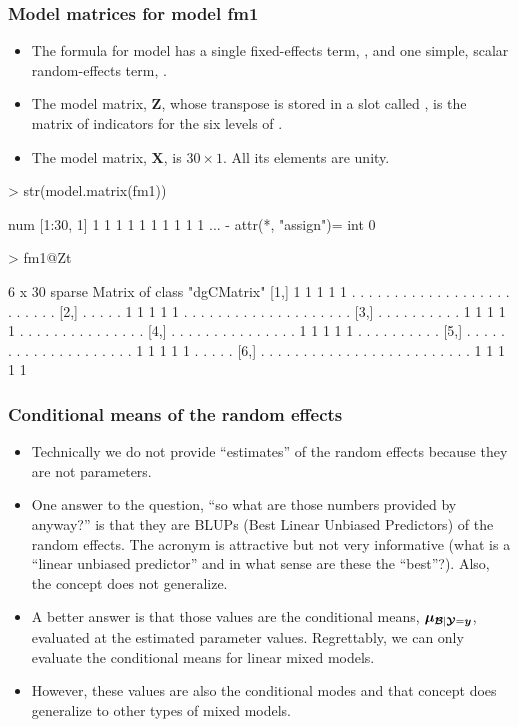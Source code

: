 \begin{frame}[fragile]
  \frametitle{Model matrices for model fm1}
  \begin{itemize}
  \item The formula for model  has a single fixed-effects
    term, , and one simple, scalar random-effects term,
    .
  \item The model matrix, $\bm Z$, whose transpose is stored in a slot
    called , is the matrix of indicators for the six levels
    of .
  \item The model matrix, $\bm X$, is $30\times 1$. All its elements
    are unity.
  \end{itemize}
\begin{Schunk}
\begin{Sinput}
> str(model.matrix(fm1))
\end{Sinput}
\begin{Soutput}
 num [1:30, 1] 1 1 1 1 1 1 1 1 1 1 ...
 - attr(*, "assign")= int 0
\end{Soutput}
\begin{Sinput}
> fm1@Zt
\end{Sinput}
\begin{Soutput}
6 x 30 sparse Matrix of class "dgCMatrix"
[1,] 1 1 1 1 1 . . . . . . . . . . . . . . . . . . . . . . . . .
[2,] . . . . . 1 1 1 1 1 . . . . . . . . . . . . . . . . . . . .
[3,] . . . . . . . . . . 1 1 1 1 1 . . . . . . . . . . . . . . .
[4,] . . . . . . . . . . . . . . . 1 1 1 1 1 . . . . . . . . . .
[5,] . . . . . . . . . . . . . . . . . . . . 1 1 1 1 1 . . . . .
[6,] . . . . . . . . . . . . . . . . . . . . . . . . . 1 1 1 1 1
\end{Soutput}
\end{Schunk}
\end{frame}

\begin{frame}
  \frametitle{Conditional means of the random effects}
  \begin{itemize}
  \item Technically we do not provide ``estimates'' of the random
    effects because they are not parameters.  
  \item One answer to the question, ``so what are those numbers
    provided by  anyway?'' is that they are BLUPs (Best
    Linear Unbiased Predictors) of the random effects.  The acronym is
    attractive but not very informative (what is a ``linear unbiased
    predictor'' and in what sense are these the ``best''?).  Also, the
    concept does not generalize.
  \item A better answer is that those values are the conditional
    means, $\bm\mu_{\bm{\mathcal{B}}|\bm{\mathcal{Y}} =\bm y}$, evaluated at the estimated
    parameter values.  Regrettably, we can only evaluate the
    conditional means for linear mixed models.
  \item However, these values are also the conditional modes and that
    concept does generalize to other types of mixed models.
  \end{itemize}
\end{frame}

